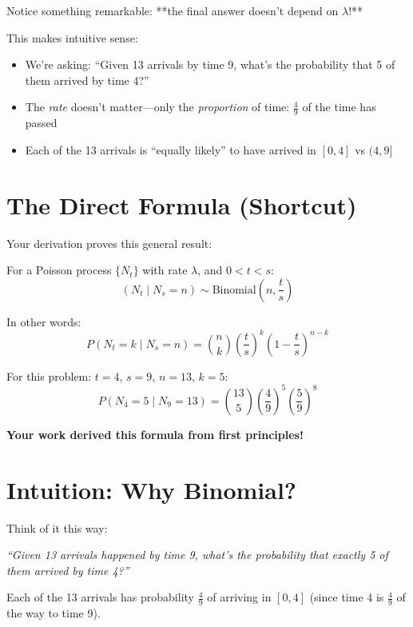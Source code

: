 \documentclass[11pt]{article}
\begin{document}
Notice something remarkable: **the final answer doesn't depend on $\lambda$!**

This makes intuitive sense:
\begin{itemize}
    \item We're asking: ``Given 13 arrivals by time 9, what's the probability that 5 of them arrived by time 4?''
    \item The \textit{rate} doesn't matter—only the \textit{proportion} of time: $\frac{4}{9}$ of the time has passed
    \item Each of the 13 arrivals is ``equally likely'' to have arrived in $[0, 4]$ vs $(4, 9]$
\end{itemize}

\section{The Direct Formula (Shortcut)}

Your derivation proves this general result:

\begin{tcolorbox}[colback=purple!5!white,colframe=purple!75!black,title=Conditional Distribution Formula]
For a Poisson process $\{N_t\}$ with rate $\lambda$, and $0 < t < s$:
\[
\boxed{(N_t \mid N_s = n) \sim \text{Binomial}\left(n, \frac{t}{s}\right)}
\]

In other words:
\[
P(N_t = k \mid N_s = n) = \binom{n}{k} \left(\frac{t}{s}\right)^k \left(1 - \frac{t}{s}\right)^{n-k}
\]
\end{tcolorbox}

For this problem: $t = 4$, $s = 9$, $n = 13$, $k = 5$:
\[
P(N_4 = 5 \mid N_9 = 13) = \binom{13}{5} \left(\frac{4}{9}\right)^5 \left(\frac{5}{9}\right)^8
\]

\textbf{Your work derived this formula from first principles!}

\section{Intuition: Why Binomial?}

Think of it this way:

\begin{center}
\textit{``Given 13 arrivals happened by time 9, what's the probability that exactly 5 of them arrived by time 4?''}
\end{center}

Each of the 13 arrivals has probability $\frac{4}{9}$ of arriving in $[0, 4]$ (since time 4 is $\frac{4}{9}$ of the way to time 9).
\end{document}
